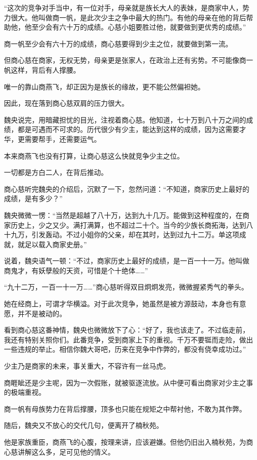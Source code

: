 \begin{this_body}
“这次的竞争对手当中，有一位对手，母亲就是族长大人的表妹，是商家中人，势力很大。他叫做商一帆，是此次少主之争中最大的热门。有他的母亲在他的背后帮助他，他至少会有六十万的成绩。心慈小姐要胜过他，就要做到更优秀的成绩。”

商一帆至少会有六十万的成绩，商心慈要得到少主之位，就要做到第一流。

但商心慈在商家，无权无势，母亲更是张家人，在政治上还有劣势。不可能像商一帆这样，背后有人撑腰。

唯一的靠山商燕飞，却正因为是族长的缘故，更不能公然偏袒她。

因此，现在落到商心慈双肩的压力很大。

魏央说完，用暗藏担忧的目光，注视着商心慈。他知道，七十万到八十万之间的成绩，都是可遇而不可求的。历代很少有少主，能达到这样的成绩，因为这需要才华，更需要帮手，还需要运气。

本来商燕飞也没有打算，让商心慈这么快就竞争少主之位。

一切都是方白二人，在背后推动。

商心慈听完魏央的介绍后，沉默了一下，忽然问道：“不知道，商家历史上最好的成绩，是有多少？”

魏央微微一愣：“当然是超越了八十万，达到九十几万。能做到这种程度的，在商家历史上，少之又少。满打满算，也不超过二十个。当今的少族长商拓海，达到八十九万，引发轰动。不过小姐你的父亲，却在其时，达到过九十二万。单这项成就，就足以载入商家史册。”

说着，魏央语气一顿：“不过，商家历史上最好的成绩，是一百一十一万。他叫做商鬼才，有妖孽般的天资，可惜是个十绝体……”

“九十二万，一百一十一万……”商心慈听得双目炯炯发亮，微微握紧秀气的拳头。

她在经商上，可谓才华横溢。对于此次竞争，她虽然是被方源鼓动，本身也有意愿，并不是被动的。

看到商心慈这番神情，魏央也微微放下了心：“好了，我也该走了。不过临走前，我还有特别关照你们。此番竞争，受到商家上下的重视。千万不要铤而走险，做出一些违规的举止。相信你魏大哥吧，历来在竞争中作弊的，都没有侥幸成功过。”

少主乃是商家的未来，事关重大，不容许有一丝马虎。

商睚眦还是少主呢，因为一次假账，就被驱逐流放。从中便可看出商家对少主之事的极端重视。

商一帆有母族势力在背后撑腰，顶多也只能在规矩之中帮衬他，不敢为其作弊。

随后，魏央又不放心的交代几句，便离开了楠秋苑。

他是家族重臣，商燕飞的心腹，按理来讲，应该避嫌。但他仍旧出入楠秋苑，为商心慈讲解这么多，足可见他的情义。


\end{this_body}

